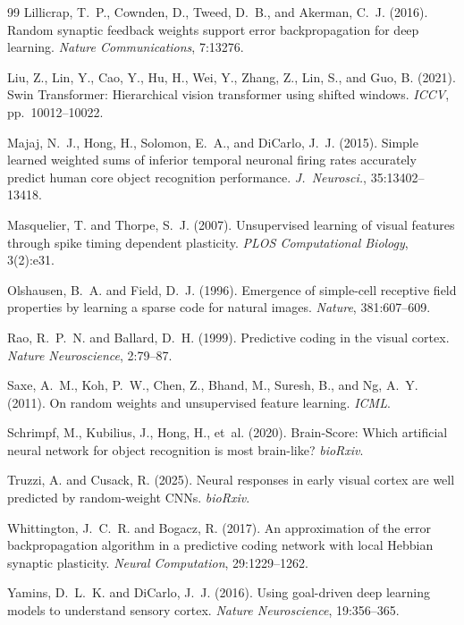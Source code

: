 \documentclass[10pt,twocolumn]{article}
\begin{document}
\begin{thebibliography}{99}
Lillicrap, T.~P., Cownden, D., Tweed, D.~B., and Akerman, C.~J. (2016). Random synaptic feedback weights support error backpropagation for deep learning. \textit{Nature Communications}, 7:13276.

Liu, Z., Lin, Y., Cao, Y., Hu, H., Wei, Y., Zhang, Z., Lin, S., and Guo, B. (2021). Swin Transformer: Hierarchical vision transformer using shifted windows. \textit{ICCV}, pp.~10012--10022.

Majaj, N.~J., Hong, H., Solomon, E.~A., and DiCarlo, J.~J. (2015). Simple learned weighted sums of inferior temporal neuronal firing rates accurately predict human core object recognition performance. \textit{J.\ Neurosci.}, 35:13402--13418.

Masquelier, T. and Thorpe, S.~J. (2007). Unsupervised learning of visual features through spike timing dependent plasticity. \textit{PLOS Computational Biology}, 3(2):e31.

Olshausen, B.~A. and Field, D.~J. (1996). Emergence of simple-cell receptive field properties by learning a sparse code for natural images. \textit{Nature}, 381:607--609.

Rao, R.~P.~N. and Ballard, D.~H. (1999). Predictive coding in the visual cortex. \textit{Nature Neuroscience}, 2:79--87.

Saxe, A.~M., Koh, P.~W., Chen, Z., Bhand, M., Suresh, B., and Ng, A.~Y. (2011). On random weights and unsupervised feature learning. \textit{ICML}.

Schrimpf, M., Kubilius, J., Hong, H., et~al. (2020). Brain-Score: Which artificial neural network for object recognition is most brain-like? \textit{bioRxiv}.

Truzzi, A. and Cusack, R. (2025). Neural responses in early visual cortex are well predicted by random-weight CNNs. \textit{bioRxiv}.

Whittington, J.~C.~R. and Bogacz, R. (2017). An approximation of the error backpropagation algorithm in a predictive coding network with local Hebbian synaptic plasticity. \textit{Neural Computation}, 29:1229--1262.

Yamins, D.~L.~K. and DiCarlo, J.~J. (2016). Using goal-driven deep learning models to understand sensory cortex. \textit{Nature Neuroscience}, 19:356--365.

\end{thebibliography}
\end{document}
